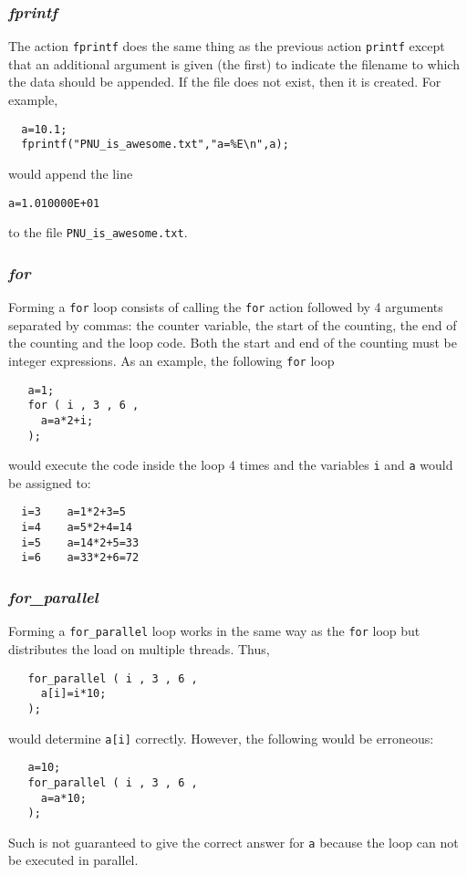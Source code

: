 \documentclass{warpdoc}
\begin{document}
\subsubsection{\emph{fprintf}}

The action \verb|fprintf| does the same thing as the previous action \verb|printf| except
that an additional argument is given (the first) to indicate the filename to which
the data should be appended. If the file does not exist, then it is created.
 For example,
%
\begin{verbatim}
  a=10.1;
  fprintf("PNU_is_awesome.txt","a=%E\n",a);
\end{verbatim}
%
would append the line
%
\begin{verbatim}
a=1.010000E+01
\end{verbatim}
%
to the file \verb|PNU_is_awesome.txt|.


\subsubsection{\emph{for}}

Forming a \verb|for| loop consists of calling the \verb|for|
action followed by 4 arguments separated by commas: the counter variable, the start of
the counting, the end of the counting and the loop code. Both
the start and end of the counting must be integer expressions.
As an example, the following \verb|for| loop
%
\begin{verbatim}
   a=1;
   for ( i , 3 , 6 ,
     a=a*2+i;
   );
\end{verbatim}
%
would execute the code inside the loop 4 times and the variables
\verb|i| and \verb|a| would be assigned to:
%
\begin{verbatim}
  i=3    a=1*2+3=5
  i=4    a=5*2+4=14
  i=5    a=14*2+5=33
  i=6    a=33*2+6=72
\end{verbatim}
%


\subsubsection{\emph{for\_parallel}}

Forming a \verb|for_parallel| loop works in the same way as the \verb|for| loop but distributes
the load on multiple threads. Thus,
%
\begin{verbatim}
   for_parallel ( i , 3 , 6 ,
     a[i]=i*10;
   );
\end{verbatim}
%
would determine \verb|a[i]| correctly. However, the following would be erroneous:
%
\begin{verbatim}
   a=10;
   for_parallel ( i , 3 , 6 ,
     a=a*10;
   );
\end{verbatim}
%
Such is not guaranteed to give the correct answer for \verb|a| because the loop can not be executed in parallel. 
\end{document}
